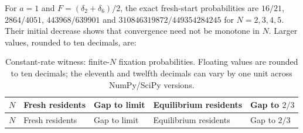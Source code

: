\documentclass[
  british,
  11pt,
  a4paper,
]{article}
\begin{document}
For \(a=1\) and \(F=(\delta_2+\delta_6)/2\), the exact fresh-start
probabilities are \(16/21\), \(2864/4051\), \(443968/639901\) and
\(310846319872/449354284245\) for \(N=2,3,4,5\). Their initial decrease
shows that convergence need not be monotone in \(N\). Larger values,
rounded to ten decimals, are:

\begin{longtable}[]{@{}
  >{\raggedleft\arraybackslash}p{}
  >{\raggedleft\arraybackslash}p{}
  >{\raggedleft\arraybackslash}p{}
  >{\raggedleft\arraybackslash}p{}
  >{\raggedleft\arraybackslash}p{}@{}}
\caption{Constant-rate witness: finite-\(N\) fixation probabilities.
Floating values are rounded to ten decimals; the eleventh and twelfth
decimals can vary by one unit across NumPy/SciPy
versions.}\tabularnewline
\toprule\noalign{}
\begin{minipage}[b]{\linewidth}\raggedleft
\(N\)
\end{minipage} & \begin{minipage}[b]{\linewidth}\raggedleft
Fresh residents
\end{minipage} & \begin{minipage}[b]{\linewidth}\raggedleft
Gap to limit
\end{minipage} & \begin{minipage}[b]{\linewidth}\raggedleft
Equilibrium residents
\end{minipage} & \begin{minipage}[b]{\linewidth}\raggedleft
Gap to \(2/3\)
\end{minipage} \\
\midrule\noalign{}
\endfirsthead
\toprule\noalign{}
\begin{minipage}[b]{\linewidth}\raggedleft
\(N\)
\end{minipage} & \begin{minipage}[b]{\linewidth}\raggedleft
Fresh residents
\end{minipage} & \begin{minipage}[b]{\linewidth}\raggedleft
Gap to limit
\end{minipage} & \begin{minipage}[b]{\linewidth}\raggedleft
Equilibrium residents
\end{minipage} & \begin{minipage}[b]{\linewidth}\raggedleft
Gap to \(2/3\)

\end{minipage}
\end{longtable}
\end{document}
